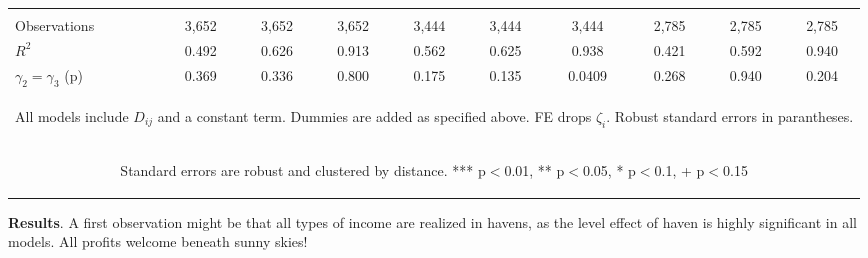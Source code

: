 \documentclass[twoside,a4paper,11pt]{article}
\begin{document}
\begin{table}
{\begin{tabular}{lccccccccc}
			 \vspace{4pt} & \begin{footnotesize}\end{footnotesize} & \begin{footnotesize}\end{footnotesize} & \begin{footnotesize}\end{footnotesize} & \begin{footnotesize}\end{footnotesize} & \begin{footnotesize}\end{footnotesize} & \begin{footnotesize}\end{footnotesize} & \begin{footnotesize}\end{footnotesize} & \begin{footnotesize}\end{footnotesize} & \begin{footnotesize}\end{footnotesize} \\
			 Observations & 3,652 & 3,652 & 3,652 & 3,444 & 3,444 & 3,444 & 2,785 & 2,785 & 2,785 \\
			 $R^2$ & 0.492 & 0.626 & 0.913 & 0.562 & 0.625 & 0.938 & 0.421 & 0.592 & 0.940 \\
			 $\gamma_2=\gamma_3$ (p) & 0.369 & 0.336 & 0.800 & 0.175 & 0.135 & 0.0409 & 0.268 & 0.940 & 0.204 \\ \hline
			 \multicolumn{10}{c}{\begin{footnotesize} All models include $ D_{ij}$ and a constant term. Dummies are added as specified above. FE drops $\zeta_i$. Robust standard errors in parantheses.\end{footnotesize}} \\
			 \multicolumn{10}{c}{\begin{footnotesize} Standard errors are robust and clustered by distance. *** p$<$0.01, ** p$<$0.05, * p$<$0.1, + p$<$0.15\end{footnotesize}} \\
		 \end{tabular}
	}
\end{table}

\textbf{Results}. A first observation might be that all types of income are realized in havens, as the level effect of haven is highly significant in all models.  All profits welcome beneath sunny skies!
\end{document}
